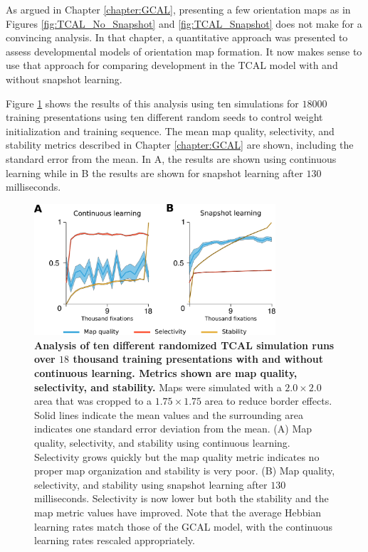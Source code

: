\documentclass[phd,ianc,twoside]{infthesis}
\begin{document}
As argued in Chapter \ref{chapter:GCAL}, presenting a few orientation
maps as in Figures \ref{fig:TCAL_No_Snapshot} and
\ref{fig:TCAL_Snapshot} does not make for a convincing analysis. In that
chapter, a quantitative approach was presented to assess developmental
models of orientation map formation. It now makes sense to use that
approach for comparing development in the TCAL model with and without
snapshot learning.

Figure \ref{fig:TCAL_Snapshot_analysis} shows the results of this
analysis using ten simulations for $18000$ training presentations using
ten different random seeds to control weight initialization and training
sequence. The mean map quality, selectivity, and stability metrics
described in Chapter \ref{chapter:GCAL} are shown, including the
standard error from the mean. In A, the results are shown using
continuous learning while in B the results are shown for snapshot
learning after $130$ milliseconds.

\begin{figure}
\center
\includegraphics[width=0.8\textwidth]{./figures/TCAL_Snapshot_OR_analysis.pdf}
\caption{{\bf Analysis of ten different randomized TCAL simulation runs
    over $18$ thousand training presentations with and without
    continuous learning. Metrics shown are map quality, selectivity, and
    stability.}  Maps were simulated with a $2.0\times2.0$ area that was
  cropped to a $1.75\times1.75$ area to reduce border effects. Solid
  lines indicate the mean values and the surrounding area indicates one
  standard error deviation from the mean. (A) Map quality, selectivity,
  and stability using continuous learning. Selectivity grows quickly but
  the map quality metric indicates no proper map organization and
  stability is very poor. (B) Map quality, selectivity, and stability
  using snapshot learning after $130$ milliseconds. Selectivity is now
  lower but both the stability and the map metric values have
  improved. Note that the average Hebbian learning rates match those of
  the GCAL model, with the continuous learning rates rescaled
  appropriately.}
\label{fig:TCAL_Snapshot_analysis}
\end{figure}
\end{document}
